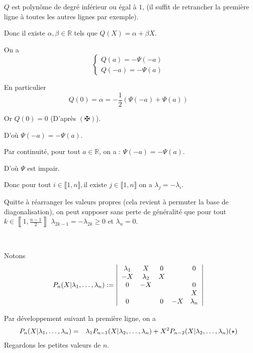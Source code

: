 $Q$ est polyn{\^o}me de degr{\'e} inf{\'e}rieur ou {\'e}gal {\`a} $1$, (il
suffit de retrancher la premi{\`e}re ligne {\`a} toutes les autres lignes par
exemple).

Donc il existe $\alpha, \beta \in \mathbb{R}$ tels que $Q (X) = \alpha + \beta
X$.

On a
\[ \left\{\begin{array}{l}
     Q (a) = - \Psi (- a)\\
     Q (- a) = - \Psi (a)
   \end{array}\right. \]


En particulier
\[ Q (0) = \alpha = - \frac{1}{2} (\Psi (- a) + \Psi (a)) \]


Or $Q (0) = 0$ (D'apr{\`e}s $(\maltese)$).

D'o{\`u} $\Psi (- a) = - \Psi (a)$.

Par continuit{\'e}, pour tout $a \in \mathbb{R}$, on a : $\Psi (- a) = - \Psi
(a)$.

D'o{\`u} $\Psi $ est impair.

Donc pour tout $i \in \llbracket 1, n \rrbracket,$il existe $j \in \llbracket
1, n \rrbracket$ on a $\lambda_j = - \lambda_i$.

Quitte {\`a} r{\'e}arranger les valeurs propres (cela revient {\`a} permuter
la base de diagonalisation), on peut supposer sans perte de
g{\'e}n{\'e}ralit{\'e} que pour tout $k \in \left\llbracket 1, \frac{n - 1}{2}
\right\rrbracket$ $\lambda_{2 k - 1} = - \lambda_{2 k} \geqslant 0$ et
$\lambda_n = 0$.

\

Notons
\[ P_n (X | \lambda_1, \ldots, \lambda_n ) := \left|
   \begin{array}{ccccc}
     \lambda_1 & X & 0 &  & 0\\
     - X & \lambda_2 & X &  & \\
     0 & - X &  &  & 0\\
     &  &  &  & X\\
     0 &  & 0 & - X & \lambda_n
   \end{array} \right| \]


Par d{\'e}veloppement suivant la premi{\`e}re ligne, on a
\begin{eqnarray*}
  P_n (X | \lambda_1, \ldots, \lambda_n ) & = & \lambda_1 P_{n - 1}
  (X | \lambda_2, \ldots, \lambda_n ) + X^2 P_{n - 2} (X |
  \lambda_2, \ldots, \lambda_n )  (\star)
\end{eqnarray*}
Regardons les petites valeurs de $n$.

